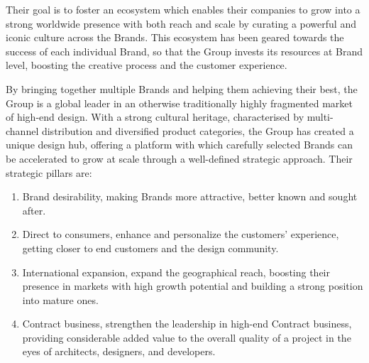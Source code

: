 \documentclass[12pt,a4paper,openright,twoside]{book}
\begin{document}
Their goal is to foster an ecosystem which enables their companies to grow into a strong worldwide presence with both reach and scale by curating a powerful and iconic culture across the Brands.
%
This ecosystem has been geared towards the success of each individual Brand, so that the Group invests its resources at Brand level, boosting the creative process and the customer experience.

By bringing together multiple Brands and helping them achieving their best, the Group is a global leader in an otherwise traditionally highly fragmented market of high-end design. 
%
With a strong cultural heritage, characterised by multi-channel distribution and diversified product categories, the Group has created a unique design hub, offering a platform with which carefully selected Brands can be accelerated to grow at scale through a well-defined strategic approach.
%
Their strategic pillars are:

\begin{enumerate}
    \item Brand desirability, making Brands more attractive, better known and sought after.
    \item Direct to consumers, enhance and personalize the customers’ experience, getting closer to end customers and the design community.
    \item International expansion, expand the geographical reach, boosting their presence in markets with high growth potential and building a strong position into mature ones.
    \item Contract business, strengthen the leadership in high-end Contract business, providing considerable added value to the overall quality of a project in the eyes of architects, designers, and developers.
\end{enumerate}
\end{document}
